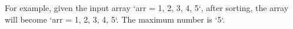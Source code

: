 \documentclass[preview]{standalone}
\begin{document}
For example, given the input array `arr = 1, 2, 3, 4, 5`, after sorting, the array will become `arr = 1, 2, 3, 4, 5`. The maximum number is `5`.\\
\end{document}
